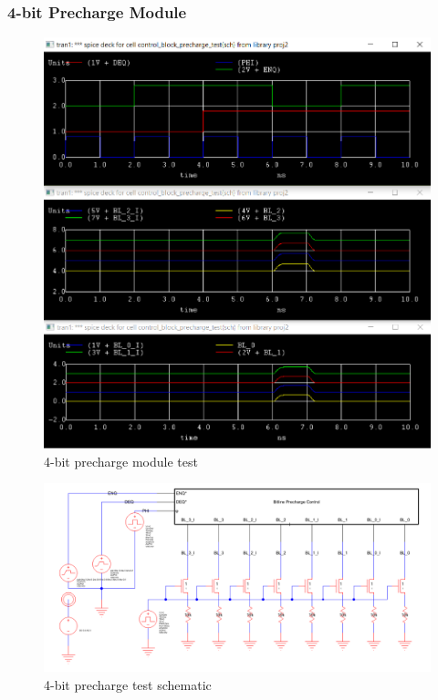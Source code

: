 \documentclass[12pt]{report}
\begin{document}
\subsubsection*{4-bit Precharge Module}
\begin{figure}[H]
  \centering
    \includegraphics[width=1.0\textwidth]{control_block_precharge_test.PNG}
  \caption{4-bit precharge module test}
  \label{fig:control_block_precharge_test}
\end{figure}
\begin{figure}[H]
  \centering
    \includegraphics[width=1.0\textwidth]{TestSchematics/precharge.PNG}
  \caption{4-bit precharge test schematic}
\end{figure}
\end{document}
